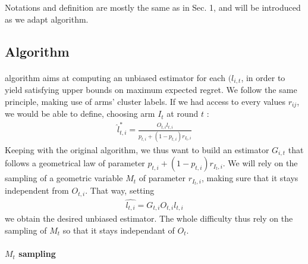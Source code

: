 \documentclass[11pt,a4paper]{article}
\begin{document}
Notations and definition are mostly the same as in Sec. 1, and will be introduced as we adapt \cite{valko} algorithm. 

\subsection{Algorithm}

\paragraph{}\cite{valko} algorithm aims at computing an unbiased estimator for each $(l_{i,t}$, in order to yield satisfying upper bounds on maximum expected regret. We follow the same principle, making use of arms' cluster labels. If we had access to every values $r_{ij}$, we would be able to define, choosing arm $I_t$ at round $t$ : 
\begin{align*}
\hat l_{t,i}^{*} = \frac{O_{t,i}l_{t,i}}{p_{t,i}+(1-p_{t,i})r_{I_t,i}}
\end{align*}
Keeping with the original algorithm, we thus want to build an estimator $G_{i,t}$ that follows a geometrical law of parameter $p_{t,i}+(1-p_{t,i})r_{I_t,i}$. We will rely on the sampling of a geometric variable $M_t$ of parameter $r_{I_t,i}$, making sure that it stays independent from $O_{t,i}$. That way, setting
\begin{align*}
\hat{l_{t,i}}=G_{t,i}O_{t,i}l_{t,i}
\end{align*}
we obtain the desired unbiased estimator. The whole difficulty thus rely on the sampling of $M_t$ so that it stays independant of $O_t$.

\paragraph{$M_t$ sampling}
\end{document}
